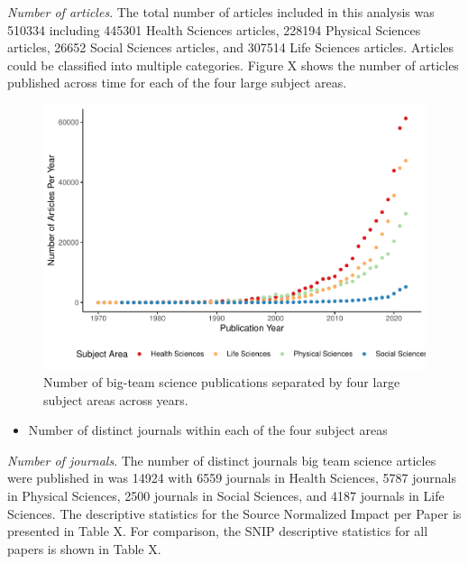 \documentclass[
  man]{apa7}
\providecommand{\tightlist}{%
  \setlength{\itemsep}{0pt}\setlength{\parskip}{0pt}}
\begin{document}
\emph{Number of articles}. The total number of articles included in this analysis was 510334 including 445301 Health Sciences articles, 228194
Physical Sciences articles, 26652 Social Sciences articles, and
307514 Life Sciences articles. Articles could be classified into
multiple categories. Figure X shows the number of articles published across time for each of the four large subject areas.

\begin{figure}
\centering
\includegraphics{manuscript_scopus_files/figure-latex/fig-pub-time-1.pdf}
\caption{\label{fig:fig-pub-time}Number of big-team science publications separated by four large subject areas across years.}
\end{figure}

\begin{itemize}
\tightlist
\item
  Number of distinct journals within each of the four subject areas
\end{itemize}

\emph{Number of journals}. The number of distinct journals big team science articles were published
in was 14924 with 6559 journals in Health Sciences,
5787 journals in Physical Sciences, 2500
journals in Social Sciences, and 4187 journals in Life
Sciences. The descriptive statistics for the Source Normalized Impact
per Paper is presented in Table X. For comparison, the SNIP descriptive
statistics for all papers is shown in Table X.
\end{document}

